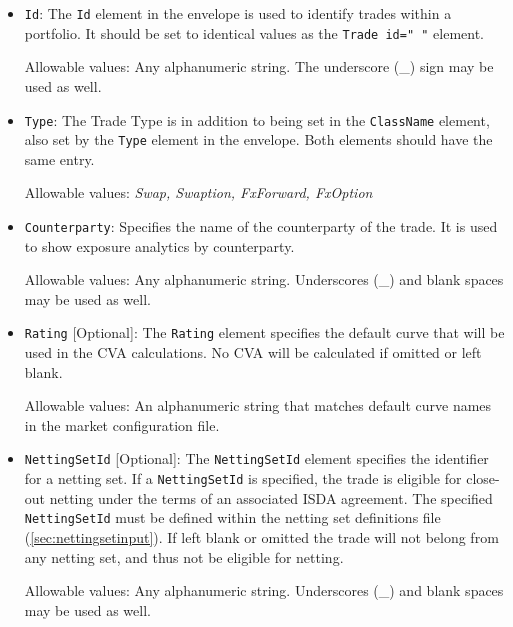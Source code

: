\begin{itemize}
\item {\tt Id}: The {\tt Id} element in the envelope is used to identify trades within a portfolio. It should be set to identical values as the {\tt Trade id="   "} element.



Allowable values: Any alphanumeric string. The underscore (\_) sign may be used as well.

\item {\tt Type}: The Trade Type is in addition to being set in the {\tt ClassName} element, also set by the {\tt Type} element in the envelope. Both elements should have the same entry.



Allowable values: \emph{Swap, Swaption, FxForward, FxOption }

\item {\tt Counterparty}: Specifies the name of the counterparty of the trade.  It is used to show exposure analytics by counterparty. 



Allowable values: Any alphanumeric string. Underscores (\_) and blank spaces may be used as well. 

\item {\tt Rating} [Optional]: The {\tt Rating} element specifies the default curve that will be used in the CVA calculations.  No CVA will be calculated if omitted or left blank.
\vspace{1em}

Allowable values: An alphanumeric string that matches default curve names in the market configuration file.  

\item {\tt NettingSetId} [Optional]: The
  {\tt NettingSetId} element specifies the identifier for a
  netting set. If a \lstinline!NettingSetId! is specified, the trade
  is eligible for close-out netting under the terms of an associated
  ISDA agreement. The specified {\tt NettingSetId} must be
  defined within the netting set definitions file (\ref{sec:nettingsetinput}). If left blank or omitted the trade will not belong from any netting set, and thus not be eligible for netting.



Allowable values: Any alphanumeric string. Underscores (\_) and blank spaces may be used as well. 




\end{itemize}
